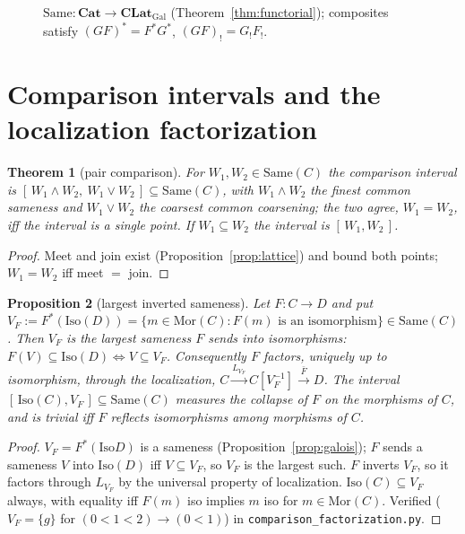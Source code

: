 \documentclass[11pt]{amsart}
\newtheorem{thm}{Theorem}[section]
\newtheorem{prop}[thm]{Proposition}
\theoremstyle{definition}
\newcommand{\Same}{\mathrm{Same}}
\newcommand{\Mor}{\mathrm{Mor}}
\newcommand{\Iso}{\mathrm{Iso}}
\newcommand{\Fstar}{F^{*}}
\newcommand{\Fshriek}{F_{!}}
\newcommand{\Cat}{\mathbf{Cat}}
\newcommand{\CLatGal}{\mathbf{CLat}_{\mathrm{Gal}}}
\begin{document}
\begin{figure}[ht]
\centering
{}
\caption{$\Same\colon\Cat\to\CLatGal$ (Theorem~\ref{thm:functorial});
composites satisfy $(GF)^{*}=F^{*}G^{*}$,
$(GF)_{!}=G_{!}F_{!}$.}
\label{fig:galois}
\end{figure}

\section{Comparison intervals and the localization factorization}\label{sec:factor}

\begin{thm}[pair comparison]\label{thm:pair}
For $W_1,W_2\in\Same(C)$ the \emph{comparison interval} is
$[\,W_1\wedge W_2,\ W_1\vee W_2\,]\subseteq\Same(C)$, with $W_1\wedge W_2$ the
finest common sameness and $W_1\vee W_2$ the coarsest common coarsening; the two
agree, $W_1=W_2$, iff the interval is a single point. If $W_1\subseteq W_2$ the
interval is $[\,W_1,W_2\,]$.
\end{thm}

\begin{proof}
Meet and join exist (Proposition~\ref{prop:lattice}) and bound both points;
$W_1=W_2$ iff meet $=$ join.
\end{proof}

\begin{prop}[largest inverted sameness]\label{prop:invert}
Let $F\colon C\to D$ and put $V_F:=\Fstar(\Iso(D))=\{m\in\Mor(C):F(m)\text{ is an
isomorphism}\}\in\Same(C)$. Then $V_F$ is the largest sameness $F$ sends into
isomorphisms: $F(V)\subseteq\Iso(D)\iff V\subseteq V_F$. Consequently $F$ factors,
uniquely up to isomorphism, through the localization,
$C\xrightarrow{L_{V_F}}C[V_F^{-1}]\xrightarrow{\bar F}D$. The interval
$[\,\Iso(C),V_F\,]\subseteq\Same(C)$ measures the collapse of $F$ on the
morphisms of $C$, and is trivial iff $F$ reflects isomorphisms among morphisms of
$C$.
\end{prop}

\begin{proof}
$V_F=\Fstar(\Iso D)$ is a sameness (Proposition~\ref{prop:galois}); $F$ sends a
sameness $V$ into $\Iso(D)$ iff $V\subseteq V_F$, so $V_F$ is the largest such.
$F$ inverts $V_F$, so it factors through $L_{V_F}$ by the universal property of
localization. $\Iso(C)\subseteq V_F$ always, with equality iff $F(m)$ iso implies
$m$ iso for $m\in\Mor(C)$. Verified ($V_F=\{g\}$ for $(0<1<2)\to(0<1)$) in
\texttt{comparison\_factorization.py}.
\end{proof}
\end{document}
